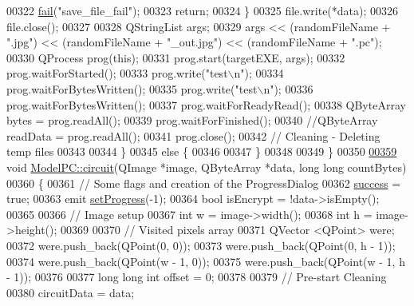 \begin{DoxyCode}
00322             \hyperlink{class_model_p_c_a47464b59b7e37fcee25e55475708aabd}{fail}(\textcolor{stringliteral}{"save\_file\_fail"});
00323             \textcolor{keywordflow}{return};
00324         \}
00325         file.write(*data);
00326         file.close();
00327 
00328         QStringList args;
00329         args << (randomFileName + \textcolor{stringliteral}{".jpg"}) << (randomFileName + \textcolor{stringliteral}{"\_out.jpg"}) << (randomFileName + \textcolor{stringliteral}{".pc"});
00330         QProcess prog(\textcolor{keyword}{this});
00331         prog.start(targetEXE, args);
00332         prog.waitForStarted();
00333         prog.write(\textcolor{stringliteral}{"test\(\backslash\)n"});
00334         prog.waitForBytesWritten();
00335         prog.write(\textcolor{stringliteral}{"test\(\backslash\)n"});
00336         prog.waitForBytesWritten();
00337         prog.waitForReadyRead();
00338         QByteArray bytes = prog.readAll();
00339         prog.waitForFinished();
00340         \textcolor{comment}{//QByteArray readData = prog.readAll();}
00341         prog.close();
00342         \textcolor{comment}{// Cleaning - Deleting temp files}
00343 
00344     \}
00345     \textcolor{keywordflow}{else} \{
00346 
00347     \}
00348 
00349 \}
00350 
\hypertarget{modelpc_8cpp_source.tex_l00359}{}\hyperlink{class_model_p_c_a1d0091062a0c836b283ec2f67411623b}{00359} \textcolor{keywordtype}{void} \hyperlink{class_model_p_c_a1d0091062a0c836b283ec2f67411623b}{ModelPC::circuit}(QImage *image, QByteArray *data, \textcolor{keywordtype}{long} \textcolor{keywordtype}{long} countBytes)
00360 \{
00361     \textcolor{comment}{// Some flags and creation of the ProgressDialog}
00362     \hyperlink{class_model_p_c_a945ffbbc44a832b953c191debd448f4c}{success} = \textcolor{keyword}{true};
00363     emit \hyperlink{class_model_p_c_afdcd80f0ed5062e145a71f09b0897547}{setProgress}(-1);
00364     \textcolor{keywordtype}{bool} isEncrypt = !data->isEmpty();
00365 
00366     \textcolor{comment}{// Image setup}
00367     \textcolor{keywordtype}{int} w = image->width();
00368     \textcolor{keywordtype}{int} h = image->height();
00369 
00370     \textcolor{comment}{// Visited pixels array}
00371     QVector <QPoint> were;
00372     were.push\_back(QPoint(0, 0));
00373     were.push\_back(QPoint(0, h - 1));
00374     were.push\_back(QPoint(w - 1, 0));
00375     were.push\_back(QPoint(w - 1, h - 1));
00376 
00377     \textcolor{keywordtype}{long} \textcolor{keywordtype}{long} \textcolor{keywordtype}{int} offset = 0;
00378 
00379     \textcolor{comment}{// Pre-start Cleaning}
00380     circuitData = data;

\end{DoxyCode}
